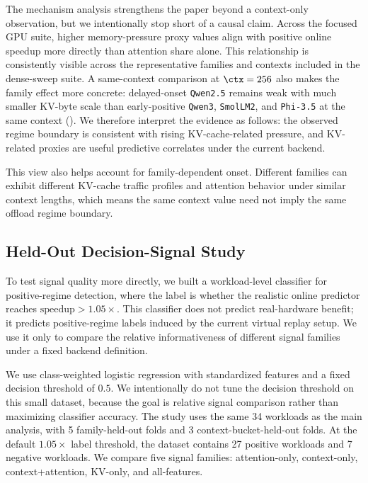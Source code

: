 The mechanism analysis strengthens the paper beyond a context-only observation, but we intentionally stop short of a causal claim. Across the focused GPU suite, higher memory-pressure proxy values align with positive online speedup more directly than attention share alone. This relationship is consistently visible across the representative families and contexts included in the dense-sweep suite. A same-context comparison at $\ctx=256$ also makes the family effect more concrete: delayed-onset \texttt{Qwen2.5} remains weak with much smaller KV-byte scale than early-positive \texttt{Qwen3}, \texttt{SmolLM2}, and \texttt{Phi-3.5} at the same context (). We therefore interpret the evidence as follows: the observed regime boundary is consistent with rising KV-cache-related pressure, and KV-related proxies are useful predictive correlates under the current backend.

This view also helps account for family-dependent onset. Different families can exhibit different KV-cache traffic profiles and attention behavior under similar context lengths, which means the same context value need not imply the same offload regime boundary.

\subsection{Held-Out Decision-Signal Study}

To test signal quality more directly, we built a workload-level classifier for positive-regime detection, where the label is whether the realistic online predictor reaches $\mathrm{speedup} > 1.05\times$. This classifier does not predict real-hardware benefit; it predicts positive-regime labels induced by the current virtual replay setup. We use it only to compare the relative informativeness of different signal families under a fixed backend definition.

We use class-weighted logistic regression with standardized features and a fixed decision threshold of $0.5$. We intentionally do not tune the decision threshold on this small dataset, because the goal is relative signal comparison rather than maximizing classifier accuracy. The study uses the same 34 workloads as the main analysis, with 5 family-held-out folds and 3 context-bucket-held-out folds. At the default $1.05\times$ label threshold, the dataset contains 27 positive workloads and 7 negative workloads. We compare five signal families: attention-only, context-only, context+attention, KV-only, and all-features.

